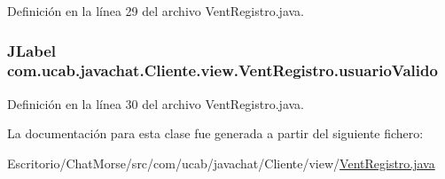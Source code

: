 Definición en la línea 29 del archivo Vent\-Registro.\-java.

\hypertarget{classcom_1_1ucab_1_1javachat_1_1_cliente_1_1view_1_1_vent_registro_a2820e50b1732f6c7f325c17ba7d980df}{
\subsubsection[{usuario\-Valido}]{\setlength{\rightskip}{0pt plus 5cm}J\-Label com.\-ucab.\-javachat.\-Cliente.\-view.\-Vent\-Registro.\-usuario\-Valido}}\label{classcom_1_1ucab_1_1javachat_1_1_cliente_1_1view_1_1_vent_registro_a2820e50b1732f6c7f325c17ba7d980df}


Definición en la línea 30 del archivo Vent\-Registro.\-java.



La documentación para esta clase fue generada a partir del siguiente fichero\-:\begin{DoxyCompactItemize}
\item 
Escritorio/\-Chat\-Morse/src/com/ucab/javachat/\-Cliente/view/\hyperlink{_vent_registro_8java}{Vent\-Registro.\-java}\end{DoxyCompactItemize}
